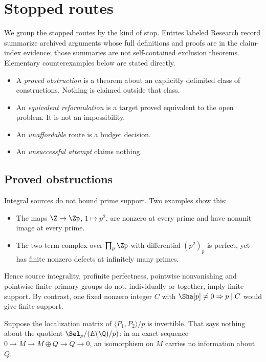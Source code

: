 \section{Stopped routes}\label{sec:obstructions}

We group the stopped routes by the kind of stop. Entries labeled Research record summarize archived arguments whose full definitions and proofs are in the claim-index evidence; those summaries are not self-contained exclusion theorems. Elementary counterexamples below are stated directly.
\begin{itemize}[leftmargin=*]
\item A \emph{proved obstruction} is a theorem about an explicitly delimited class of constructions. Nothing is claimed outside that class.
\item An \emph{equivalent reformulation} is a target proved equivalent to the open problem. It is not an impossibility.
\item An \emph{unaffordable} route is a budget decision.
\item An \emph{unsuccessful attempt} claims nothing.
\end{itemize}

\subsection{Proved obstructions}
\begin{obstruction}\label{obs:support}
Integral sources do not bound prime support. Two examples show this:
\begin{itemize}[leftmargin=*]
\item The maps $\Z\to\Zp$, $1\mapsto p^2$, are nonzero at every prime and have nonunit image at every prime.
\item The two-term complex over $\prod_p\Zp$ with differential $(p^2)_p$ is perfect, yet has finite nonzero defects at infinitely many primes.
\end{itemize}
Hence source integrality, profinite perfectness, pointwise nonvanishing and pointwise finite primary groups do not, individually or together, imply finite support. By contrast, one fixed nonzero integer $C$ with $\Sha[p]\neq0\Rightarrow p\mid C$ would give finite support.
\end{obstruction}

\begin{obstruction}\label{obs:det}
Suppose the localization matrix of $\langle P_1,P_2\rangle/p$ is invertible. That says nothing about the quotient $\Sel_p/(E(\Q)/p)$: in an exact sequence $0\to M\to M\oplus Q\to Q\to0$, an isomorphism on $M$ carries no information about $Q$.
\end{obstruction}

